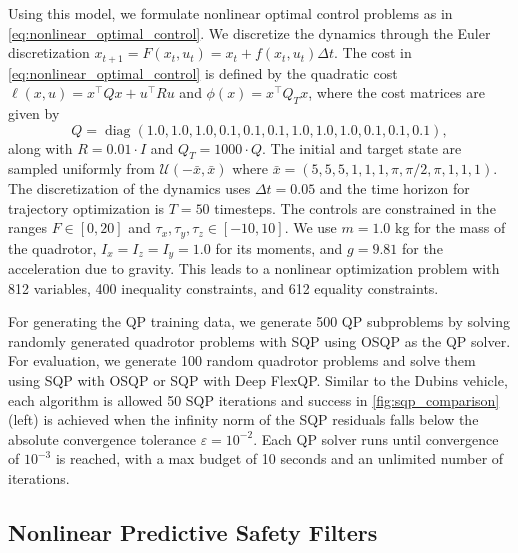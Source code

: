 \documentclass{article} %
\DeclareMathOperator{\diag}{diag}
\begin{document}
Using this model, we formulate nonlinear optimal control problems as in \cref{eq:nonlinear_optimal_control}. We discretize the dynamics through the Euler discretization $x_{t+1} = F(x_t, u_t) = x_t + f(x_t, u_t)\Delta t$. The cost in \cref{eq:nonlinear_optimal_control} is defined by the quadratic cost $\ell(x, u) = x^\top Q x + u^\top R u$ and $\phi(x) = x^\top Q_T x$, where the cost matrices are given by
\begin{equation*}
Q = \diag(1.0, 1.0, 1.0, 0.1, 0.1, 0.1, 1.0, 1.0, 1.0, 0.1, 0.1, 0.1),
\end{equation*}
along with $R = 0.01\cdot I$ and $Q_T = 1000\cdot Q$.
The initial and target state are sampled uniformly from $\mathcal{U}(-\bar{x}, \bar{x})$ where $\bar{x} = (5, 5, 5, 1, 1, 1, \pi, \pi/2, \pi, 1, 1, 1)$. The discretization of the dynamics uses $\Delta t = 0.05$ and the time horizon for trajectory optimization is $T = 50$ timesteps. The controls are constrained in the ranges $F \in [0, 20]$ and $\tau_x,\tau_y,\tau_z \in [-10, 10]$. We use $m = 1.0$ kg for the mass of the quadrotor, $I_x = I_z = I_y= 1.0$ for its moments, and $g = 9.81$ for the acceleration due to gravity. This leads to a nonlinear optimization problem with 812 variables, 400 inequality constraints, and 612 equality constraints.

For generating the QP training data, we generate 500 QP subproblems by solving randomly generated quadrotor problems with SQP using OSQP as the QP solver.
For evaluation, we generate 100 random quadrotor problems and solve them using SQP with OSQP or SQP with Deep FlexQP.
Similar to the Dubins vehicle, each algorithm is allowed 50 SQP iterations and success in \cref{fig:sqp_comparison} (left) is achieved when the infinity norm of the SQP residuals falls below the absolute convergence tolerance $\varepsilon = 10^{-2}$.
Each QP solver runs until convergence of $10^{-3}$ is reached, with a max budget of 10 seconds and an unlimited number of iterations.

\subsection{Nonlinear Predictive Safety Filters}
\label{appendix:safety_filter}
\end{document}
